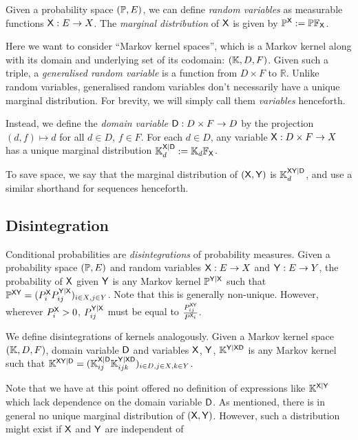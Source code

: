 Given a probability space $(\mathbb{P},E)$, we can define \emph{random variables} as measurable functions $\mathsf{X}:E\to X$. The \emph{marginal distribution} of $\mathsf{X}$ is given by $\mathbb{P}^{\mathsf{X}}:=\mathbb{P}\mathbb{F}_{\mathsf{X}}$. 

Here we want to consider ``Markov kernel spaces'', which is a Markov kernel along with its domain and underlying set of its codomain: $(\mathbb{K},D,F)$. Given such a triple, a \emph{generalised random variable} is a function from $D\times F$ to $\mathbb{R}$. Unlike random variables, generalised random variables don't necessarily have a unique marginal distribution. For brevity, we will simply call them \emph{variables} henceforth.

Instead, we define the \emph{domain variable} $\mathsf{D}:D\times F\to D$ by the projection $(d,f)\mapsto d$ for all $d\in D$, $f\in F$. For each $d\in D$, any variable $\mathsf{X}:D\times F\to X$ has a unique marginal distribution $\mathbb{K}^{\mathsf{X}|\mathsf{D}}_d:=\mathbb{K}_d\mathbb{F}_{\mathsf{X}}$. 

To save space, we say that the marginal distribution of $(\mathsf{X},\mathsf{Y})$ is $\mathbb{K}^{\mathsf{XY}|\mathsf{D}}_d$, and use a similar shorthand for sequences henceforth.

\subsection{Disintegration}\label{ssec:disintegration}

Conditional probabilities are \emph{disintegrations} of probability measures. Given a probability space $(\mathbb{P},E)$ and random variables $\mathsf{X}:E\to X$ and $\mathsf{Y}:E\to Y$, the probability of $\mathsf{X}$ given $\mathsf{Y}$ is any Markov kernel $\mathbb{P}^{\mathsf{Y}|\mathsf{X}}$ such that $\mathbb{P}^{\mathsf{XY}}= (P^{\mathsf{X}}_i P^{\mathsf{Y}|\mathsf{X}}_{ij})_{i\in X, j\in Y}$. Note that this is generally non-unique. However, wherever $P^{\mathsf{X}}_i>0$, $P^{\mathsf{Y}|\mathsf{X}}_{ij}$ must be equal to $\frac{P^{\mathsf{XY}}_{ij}}{P^{\mathsf{X}_i}}$.

We define disintegrations of kernels analogously. Given a Markov kernel space $(\mathbb{K},D,F)$, domain variable $\mathsf{D}$ and variables $\mathsf{X}$, $\mathsf{Y}$, $\mathbb{K}^{\mathsf{Y}|\mathsf{X}\mathsf{D}}$ is any Markov kernel such that $\mathbb{K}^{\mathsf{XY}|\mathsf{D}} = (\mathbb{K}^{\mathsf{X}|\mathsf{D}}_{ij} \mathbb{K}^{\mathsf{Y}|\mathsf{X}\mathsf{D}}_{ijk})_{i\in D,j\in X,k\in Y}$. 

Note that we have at this point offered no definition of expressions like $\mathbb{K}^{\mathsf{X}|\mathsf{Y}}$ which lack dependence on the domain variable $\mathsf{D}$. As mentioned, there is in general no unique marginal distribution of $(\mathsf{X},\mathsf{Y})$. However, such a distribution might exist if $\mathsf{X}$ and $\mathsf{Y}$ are independent of 

